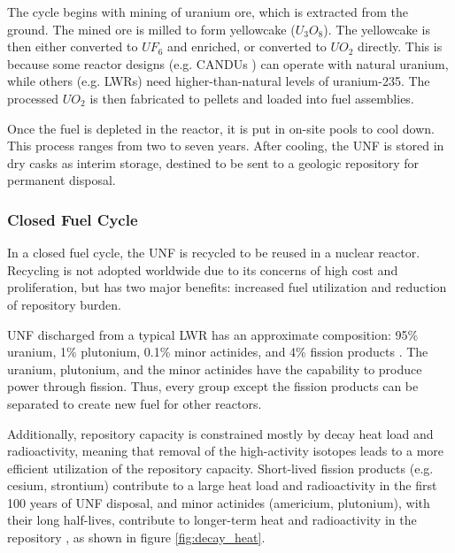 The cycle begins with mining of uranium ore, which is extracted from the
ground. The mined ore is milled to form yellowcake ($U_3O_8$). 
The yellowcake is then either converted to $UF_6$ and enriched, or converted
to $UO_2$ directly. This is because some reactor designs (e.g. \glspl{CANDU} \cite{torgerson_candu_2006})
can operate with natural uranium, while others (e.g. \glspl{LWR}) need
higher-than-natural levels of uranium-235. The processed $UO_2$ is
then fabricated to pellets and loaded into fuel assemblies. 

Once the fuel is depleted in the reactor, it is put in on-site pools to cool down.
This process ranges from two to seven years. After cooling, the \gls{UNF}
is stored in dry casks as interim storage, destined to be sent to a geologic repository
for permanent disposal.

\subsubsection{Closed Fuel Cycle}
In a closed fuel cycle, the \gls{UNF} is recycled to be reused
in a nuclear reactor. Recycling is not adopted worldwide due to
its concerns of high cost and proliferation, but has two major
benefits: increased fuel utilization and reduction of repository
burden. 

\gls{UNF} discharged from a typical \gls{LWR} has an approximate
composition: 95\% uranium, 1\% plutonium, 0.1\%
minor actinides, and 4\% fission products \cite{feiveson_spent_2011}.
The uranium, plutonium, and the minor actinides have the capability
to produce power through fission. Thus, every group except the
fission products can be separated to create new fuel for other reactors.

Additionally, repository capacity is constrained mostly by decay heat
load and radioactivity, meaning that removal of the high-activity
isotopes leads to a more efficient utilization of the repository
capacity. Short-lived fission products (e.g. cesium, strontium) contribute
to a large heat load and radioactivity in the first 100 years of \gls{UNF} disposal,
and minor actinides (americium, plutonium), with their long half-lives,
contribute to longer-term heat and radioactivity in the repository \cite{wigeland_separations_2006},
as shown in figure \ref{fig:decay_heat}.


